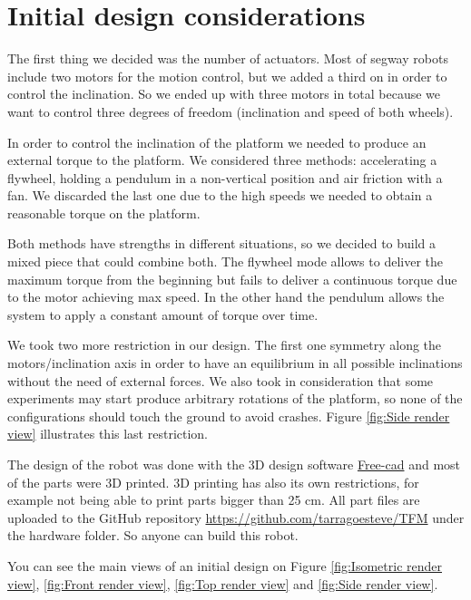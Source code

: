 \section{Initial design considerations}
The first thing we decided was the number of actuators.
Most of segway robots include two motors for the motion control, but
we added a third on in order to control the inclination.
So we ended up with three motors in total because we want to control
three degrees of freedom (inclination and speed of both wheels).

In order to control the inclination of the platform we needed to produce
an external torque to the platform. We considered three methods: accelerating
a flywheel, holding a pendulum in a non-vertical position and air friction
with a fan. We discarded the last one due to the high speeds we needed to obtain
a reasonable torque on the platform.

Both methods have strengths in different situations, so we decided to build a mixed
piece that could combine both. The flywheel mode allows to deliver the maximum torque from
the beginning but fails to deliver a continuous torque due to the motor achieving max speed.
In the other hand the pendulum allows the system to apply a constant amount of torque over time.

We took two more restriction in our design. The first one symmetry along the motors/inclination
axis in order to have an equilibrium in all possible inclinations without the need of external forces.
We also took in consideration that some experiments may start produce arbitrary rotations of the platform,
so none of the configurations should touch the ground to avoid crashes. Figure \ref{fig:Side render view} illustrates this last restriction.

The design of the robot was done with the 3D design software \href{https://www.freecadweb.org/}{Free-cad} and 
most of the parts were 3D printed. 3D printing has also its own restrictions, for example not being able to print
parts bigger than 25 cm. All part files are uploaded to the GitHub repository \url{https://github.com/tarragoesteve/TFM}
under the hardware folder. So anyone can build this robot.

You can see the main views of an initial design on Figure \ref{fig:Isometric render view},
\ref{fig:Front render view}, \ref{fig:Top render view} and \ref{fig:Side render view}.

